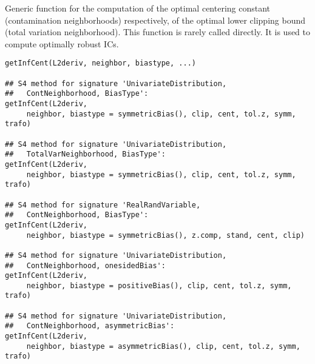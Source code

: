 \begin{Description}\relax
Generic function for the computation of the optimal centering constant
(contamination neighborhoods) respectively, of the optimal lower clipping
bound (total variation neighborhood).
This function is rarely called directly. It is used to 
compute optimally robust ICs.
\end{Description}
\begin{Usage}
\begin{verbatim}
getInfCent(L2deriv, neighbor, biastype, ...)

## S4 method for signature 'UnivariateDistribution,
##   ContNeighborhood, BiasType':
getInfCent(L2deriv, 
     neighbor, biastype = symmetricBias(), clip, cent, tol.z, symm, trafo)

## S4 method for signature 'UnivariateDistribution,
##   TotalVarNeighborhood, BiasType':
getInfCent(L2deriv, 
     neighbor, biastype = symmetricBias(), clip, cent, tol.z, symm, trafo)

## S4 method for signature 'RealRandVariable,
##   ContNeighborhood, BiasType':
getInfCent(L2deriv, 
     neighbor, biastype = symmetricBias(), z.comp, stand, cent, clip)

## S4 method for signature 'UnivariateDistribution,
##   ContNeighborhood, onesidedBias':
getInfCent(L2deriv, 
     neighbor, biastype = positiveBias(), clip, cent, tol.z, symm, trafo)

## S4 method for signature 'UnivariateDistribution,
##   ContNeighborhood, asymmetricBias':
getInfCent(L2deriv, 
     neighbor, biastype = asymmetricBias(), clip, cent, tol.z, symm, trafo)
\end{verbatim}
\end{Usage}
